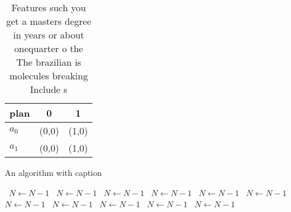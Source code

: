 \documentclass[a4paper]{article}
\begin{document}
\begin{table}
\begin{adjustbox}{width=0.8\columnwidth}
\begin{tabular}{|l|l|l|}
\hline
\textbf{plan} & \multicolumn{1}{c|}{\textbf{0}} & \multicolumn{1}{c|}{\textbf{1}} \\ \hline
\textbf{$a_0$}  & (0,0) & (1,0) \\ \hline
\textbf{$a_1$}  & (0,0) & (1,0) \\ \hline
\end{tabular}
\end{adjustbox}
\caption{Features such you get a masters degree in years or about onequarter o the The brazilian is molecules breaking Include s
}
\end{table}

\begin{algorithm}
\caption{An algorithm with caption}
\begin{algorithmic}
\    \State $N \gets N - 1$
\    \State $N \gets N - 1$
\    \State $N \gets N - 1$
\    \State $N \gets N - 1$
\    \State $N \gets N - 1$
\    \State $N \gets N - 1$
\    \State $N \gets N - 1$
\    \State $N \gets N - 1$
\    \State $N \gets N - 1$
\    \State $N \gets N - 1$
\    \State $N \gets N - 1$
\EndWhile
\end{algorithmic}
\end{algorithm}
\end{document}
